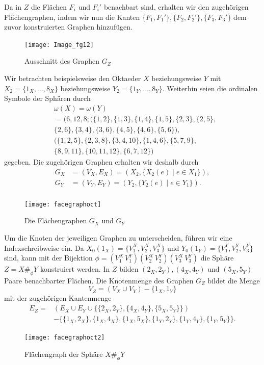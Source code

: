 \documentclass[12pt,titlepage,twoside,cleardoublepage]{article}
\theoremstyle{nummermitklammern}
\numberwithin{equation}{section}
\begin{document}
Da in $Z$ die Flächen $F_i$ und $F_i'$ benachbart sind, erhalten wir den zugehörigen Flächengraphen, indem wir nun die Kanten $\{F_1,F_1'\},\{F_2,F_2'\},\{F_3,F_3'\}$ dem zuvor konstruierten Graphen hinzufügen. 
\begin{figure}[H]
\begin{center}
\texttt{[image: Image\_fg12]}
\end{center}
\caption{Ausschnitt des Graphen $G_Z$}
\end{figure}
Wir betrachten beispielsweise den Oktaeder $X$ beziehungsweise $Y$ mit $X_2=\{1_X,\ldots,8_X\}$ beziehungsweise $Y_2=\{1_Y,\ldots,8_Y\}.$
Weiterhin seien die ordinalen Symbole der Sphären durch
\begin{align*}
&\omega(X)= \omega(Y)\\
 &=(6,12,8;(\{1,2\},\{1,3\},\{1,4\},\{1,5\},\{2,3\},\{2,5\},\\
 &\{2,6\},\{3,4\},\{3,6\},\{4,5\},\{4,6\},\{5,6\}),\\
 &(\{1,2,5\},\{2,3,8\},\{3,4,10\},\{1,4,6\},\{5,7,9\},\\&\{8,9,11\},\{10,11,12\},\{6,7,12\})
 \end{align*}
 gegeben. Die zugehörigen Graphen erhalten wir deshalb durch 
\begin{align*}
G_X&=(V_X,E_X)=(X_2,\{X_2(e)\mid e\in X_1\}),\\G_Y&=(V_Y,E_Y)=(Y_2,\{Y_2(e)\mid e\in Y_1\}).\\
\end{align*}
 \begin{figure}[H]
\begin{center}
\texttt{[image: facegraphoct]}
\end{center}
\caption{Die Flächengraphen $G_X$ und $G_Y$}
\end{figure}   
Um die Knoten der jeweiligen Graphen zu unterscheiden, führen wir eine Indexschreibweise ein.
Da $X_0(1_X)=\{V^X_1,V^X_2,V^X_3\}$ und $Y_0(1_Y)=\{V^Y_1,V^Y_2,V^Y_3\}$ sind, kann mit der Bijektion $\phi=(V^X_1\,V^Y_1)(V^X_2\,V_2^Y)(V_3^X\,V_3^Y)$ die Sphäre $Z=X\#_\phi Y$ konstruiert werden. In $Z$ bilden $(2_X,2_Y),(4_X,4_Y)$ und $(5_X,5_Y)$ Paare benachbarter Flächen.
Die Knotenmenge des Graphen $G_Z$ bildet die Menge 
\[
V_Z=(V_X \cup V_Y)-\{1_X,1_Y\}
\]
mit der zugehörigen Kantenmenge 
\begin{align*}
E_Z=&(E_X \cup E_Y\cup \{\{2_X,2_Y\},\{4_X,4_Y\},\{5_X,5_Y\}\})\\
&-\{\{1_X,2_X\},\{1_X,4_X\},\{1_X,5_X\},\{1_Y,2_Y\},\{1_Y,4_Y\},\{1_Y,5_Y\}\}.
\end{align*}
\begin{figure}[H]
\begin{center}
\texttt{[image: facegraphoct2]}
\end{center}
\caption{Flächengraph der Sphäre $X\#_{\phi} Y$}
\end{figure}   
\end{document}
